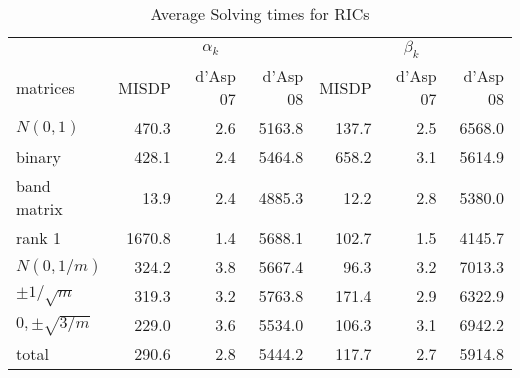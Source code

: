 \begin{table} 
 \begin{scriptsize} \caption{Average Solving times for RICs} 
 \label{rhsTime} 
 \begin{tabular*}{\linewidth}{@{}l@{\;\;\extracolsep{\fill}}rrrrrr@{}}\toprule 
  & \multicolumn{3}{c}{$\alpha_k$} & \multicolumn{3}{c}{$\beta_k$} \\ 
\cmidrule(r){2-4} \cmidrule(l){5-7} 
 matrices & MISDP & d'Asp 07 & d'Asp 08 & MISDP & d'Asp 07 & d'Asp 08 \\ \midrule 
$N(0,1)$& \num{470.3} & \num{2.6} & \num{5163.8} & \num{137.7} & \num{2.5} & \num{6568.0} \\ 
 binary& \num{428.1} & \num{2.4} & \num{5464.8} & \num{658.2} & \num{3.1} & \num{5614.9} \\ 
 band matrix& \num{13.9} & \num{2.4} & \num{4885.3} & \num{12.2} & \num{2.8} & \num{5380.0} \\ 
 rank 1& \num{1670.8} & \num{1.4} & \num{5688.1} & \num{102.7} & \num{1.5} & \num{4145.7} \\ 
 $N(0,1/m)$& \num{324.2} & \num{3.8} & \num{5667.4} & \num{96.3} & \num{3.2} & \num{7013.3} \\ 
 $\pm 1/\sqrt{m}$& \num{319.3} & \num{3.2} & \num{5763.8} & \num{171.4} & \num{2.9} & \num{6322.9} \\ 
 $0, \pm \sqrt{3/m}$& \num{229.0} & \num{3.6} & \num{5534.0} & \num{106.3} & \num{3.1} & \num{6942.2} \\ 
 \midrule 
total & \num{290.6} & \num{2.8} & \num{5444.2} & \num{117.7} & \num{2.7} & \num{5914.8} \\ 
 \bottomrule 
 \end{tabular*} 
 \end{scriptsize} 
 \end{table} 
